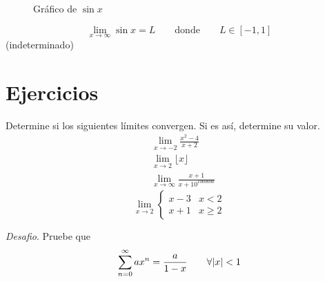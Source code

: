 \documentclass[spanish,12pt]{article}
\begin{document}
    \begin{figure}[h!]
		\begin{center}
	\caption{Gráfico de $\sin{x}$}
	\end{center}
	\end{figure}
	$$\lim_{x\to\infty}\sin{x}=L\quad\quad\text{donde}\quad\quad L\in [-1,1]$$
	(indeterminado)
	\newpage
\section{Ejercicios}
Determine si los siguientes límites convergen. Si es así, determine su valor.
\begin{align*}
&\lim_{x\to-2}\frac{x^2-4}{x+2}\\
&\lim_{x\to2}\lfloor x\rfloor\\
&\lim_{x\to\infty} \frac{x+1}{x+10^{1000000}}
\end{align*}
$$\lim_{x\to2} \begin{cases} 
      x-3 & x<2 \\
    x+1 & x\geq2
   \end{cases}
$$

\textit{Desafio}. Pruebe que 
\begin{align*}
    \sum_{n=0}^\infty ax^n=\frac{a}{1-x} \quad\quad \forall \abs{x}<1
\end{align*}
\end{document}
